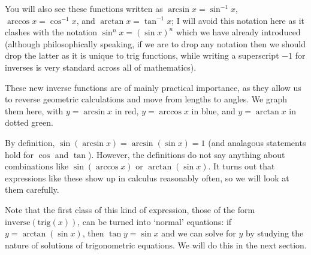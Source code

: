 \documentclass[a4paper,leqno]{article}
\numberwithin{equation}{section}
\theoremstyle{definition}
\theoremstyle{remark}
\begin{document}
You will also see these functions written as $ \arcsin x = \sin^{-1} x $, $ \arccos x = \cos^{-1} x $, and $ \arctan x = \tan^{-1} x $; I will avoid
this notation here as it clashes with the notation $ \sin^n x = (\sin x)^n $ which we have already introduced (although philosophically speaking, if
we are to drop any notation then we should drop the latter as it is unique to trig functions, while writing a superscript $ -1 $ for inverses is very
standard across all of mathematics).

These new inverse functions are of mainly practical importance, as they allow us to reverse geometric calculations and move from lengths
to angles. We graph them here, with $ y = \arcsin x $ in red, $ y = \arccos x $ in blue, and $ y = \arctan x $ in dotted green.
\begin{center}
\end{center}

By definition, $ \sin(\arcsin x) = \arcsin(\sin x) = 1 $ (and analagous statements hold for $ \cos $ and $ \tan $). However, the
definitions do not say anything about combinations like $ \sin(\arccos x) $ or $ \arctan(\sin x) $. It turns out that expressions
like these show up in calculus reasonably often, so we will look at them carefully.

Note that the first class of this kind of expression, those of the form $ \text{inverse}(\text{trig}(x)) $, can be turned into
`normal' equations: if $ y = \arctan(\sin x) $, then $ \tan y = \sin x $ and we can solve for $ y $ by studying the nature of
solutions of trigonometric equations. We will do this in the next section.
\end{document}
